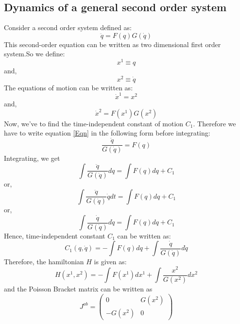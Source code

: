 \documentclass[12pt]{article}
\begin{document}
\subsection{Dynamics of a general second order system}
Consider a second order system defined as:
\begin{equation}
\ddot{q}=F(q) G(\dot{q})
\label{76}
\end{equation}
This second-order equation can be written as two dimensional first order system.So we define:
\begin{equation}
x^{1} \equiv q \label{77}
\end{equation}
and,
\begin{equation}
x^{2} \equiv \dot{q} \label{78}
\end{equation}
The equations of motion can be written as:
\begin{equation}
\dot{x}^{1}=x^{2} \label{79}
\end{equation}
and,
\begin{equation}
\dot{x}^{2}=F\left(x^{1}\right) G\left(x^{2}\right) \label{80}
\end{equation}
Now, we've to find the time-independent constant of motion $C_{1}$. Therefore we have to write equation \eqref{Eqn} in the following form before integrating:
\begin{equation}
\frac{\ddot{q}}{G(\dot{q})}=F(q) \label{81}
\end{equation}
Integrating, we get
\begin{equation}
\int\frac{\ddot{q}}{G(\dot{q})}dq = \int F(q) d q + C_{1} \label{82}
\end{equation}
or,
\begin{equation}
\int\frac{\ddot{q}}{G(\dot{q})}\dot{q}dt = \int F(q) d q + C_{1}
\end{equation}
or,
\begin{equation}
\int\frac{\dot{q}}{G(\dot{q})}d\dot{q} = \int F(q) d q + C_{1}
\end{equation}
Hence, time-independent constant $C_{1}$ can be written as:
\begin{equation}
C_{1}(q, \dot{q})=-\int F(q) d q+\int \frac{\dot{q}}{G(\dot{q})} d \dot{q}
\label{85}
\end{equation}
Therefore, the hamiltonian $H$ is given as:
\begin{equation}
H\left(x^{1}, x^{2}\right)=-\int F\left(x^{1}\right) d x^{1}+\int \frac{x^{2}}{G\left(x^{2}\right)} d x^{2}
\end{equation}
and the Poisson Bracket matrix can be written as 
\begin{equation}
J^{a b}=\left( \begin{array}{cc}{0} & {G\left(x^{2}\right)} \\ {-G\left(x^{2}\right)} & {0}\end{array}\right)
\end{equation}
\end{document}
